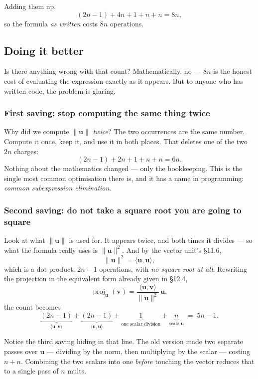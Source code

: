 \documentclass[11pt]{article}
\theoremstyle{plain}
\theoremstyle{definition}
\theoremstyle{remark}
\newcommand{\vc}[1]{\mathbf{#1}}
\newcommand{\norm}[1]{\lVert #1\rVert}
\newcommand{\proj}[2]{\operatorname{proj}_{#1}(#2)}
\begin{document}
\noindent Adding them up,
\[
  (2n-1) + 4n + 1 + n + n = 8n ,
\]
so the formula \emph{as written} costs $8n$ operations.

\subsection{Doing it better}
Is there anything wrong with that count? Mathematically, no --- $8n$ is the
honest cost of evaluating the expression exactly as it appears. But to anyone
who has written code, the problem is glaring.

\subsubsection*{First saving: stop computing the same thing twice}
Why did we compute $\norm{\vc{u}}$ \emph{twice}? The two occurrences are the
same number. Compute it once, keep it, and use it in both places. That deletes
one of the two $2n$ charges:
\[
  (2n-1) + 2n + 1 + n + n = 6n .
\]
Nothing about the mathematics changed --- only the bookkeeping. This is the
single most common optimisation there is, and it has a name in programming:
\emph{common subexpression elimination}.

\subsubsection*{Second saving: do not take a square root you are going to square}
Look at what $\norm{\vc{u}}$ is used for. It appears twice, and both times it
divides --- so what the formula really uses is $\norm{\vc{u}}^{2}$. And by the
vector unit's \S11.6,
\[
  \norm{\vc{u}}^{2} = \langle\vc{u},\vc{u}\rangle ,
\]
which is a dot product: $2n-1$ operations, with \emph{no square root at all}.
Rewriting the projection in the equivalent form already given in \S12.4,
\[
  \proj{\vc{u}}{\vc{v}}
  = \frac{\langle\vc{u},\vc{v}\rangle}{\norm{\vc{u}}^{2}}\,\vc{u} ,
\]
the count becomes
\[
  \underbrace{(2n-1)}_{\langle\vc{u},\vc{v}\rangle}
  + \underbrace{(2n-1)}_{\langle\vc{u},\vc{u}\rangle}
  + \underbrace{1}_{\text{one scalar division}}
  + \underbrace{n}_{\text{scale }\vc{u}}
  \;=\; 5n-1 .
\]

\noindent Notice the third saving hiding in that line. The old version made two
separate passes over $\vc{u}$ --- dividing by the norm, then multiplying by the
scalar --- costing $n+n$. Combining the two scalars into one \emph{before}
touching the vector reduces that to a single pass of $n$ mults.
\end{document}
